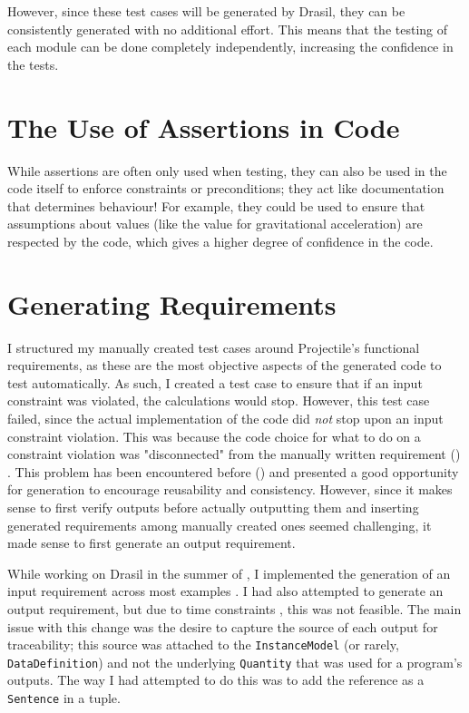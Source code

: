 However, since these test cases will be generated by Drasil, they can be
consistently generated with no additional effort. This means that the testing
of each module can be done completely independently, increasing the confidence
in the tests.

\section{The Use of Assertions in Code}
\label{chap:dev-proc:code-assertions}

While assertions are often only used when testing, they can also be used in
the code itself to enforce constraints or preconditions; they act like
documentation that determines behaviour! For example, they could be used to
ensure that assumptions about values (like the value for gravitational
acceleration) are respected by the code, which gives a higher degree of
confidence in the code.

\section{Generating Requirements}
\label{chap:dev-proc:gen-reqs}

I structured my manually created test cases around Projectile's functional
requirements, as these are the most objective aspects of the generated code to
test automatically. As such, I created a test case to ensure that if an input
constraint was violated, the calculations would stop.
 However, this test case failed,
since the actual implementation of the code did \emph{not} stop upon an input
constraint violation. This was because the code choice for what to do on a
constraint violation was "disconnected" from the manually written requirement
() . This problem has been encountered
before ()  and presented a good
opportunity for generation to encourage reusability and consistency. However,
since it makes sense to first verify outputs before actually outputting them
and inserting generated requirements among manually created ones seemed
challenging, it made sense to first generate an output requirement.

While working on Drasil in the summer of , I implemented the generation
of an input requirement across most examples .
I had also attempted to generate an output requirement, but due to time
constraints , this was not feasible. The
main issue with this change was the desire to capture the source of each output
for traceability; this source was attached to the \texttt{InstanceModel}
(or rarely, \texttt{DataDefinition}) and not the underlying \texttt{Quantity}
 that was used for a program's outputs. The way I
had attempted to do this was to add the reference as a \texttt{Sentence} in a
tuple.

